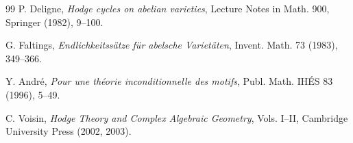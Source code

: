 \documentclass[11pt]{article}
\begin{document}
\begin{thebibliography}{99}
P. Deligne, \emph{Hodge cycles on abelian varieties},
Lecture Notes in Math. 900, Springer (1982), 9--100.

G. Faltings, \emph{Endlichkeitss\"atze f\"ur abelsche Variet\"aten},
Invent. Math. 73 (1983), 349--366.

Y. Andr\'e, \emph{Pour une th\'eorie inconditionnelle des motifs},
Publ. Math. IH\'ES 83 (1996), 5--49.

C. Voisin, \emph{Hodge Theory and Complex Algebraic Geometry},
Vols. I--II, Cambridge University Press (2002, 2003).

\end{thebibliography}
\end{document}
